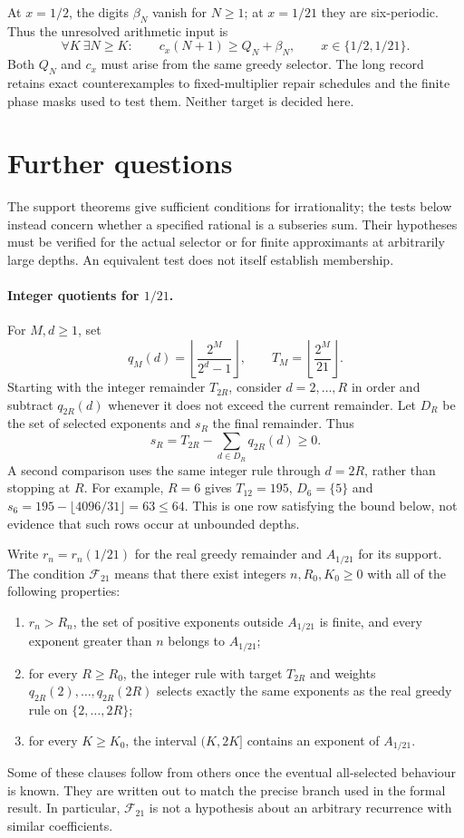 \documentclass[11pt]{article}
\begin{document}
At $x=1/2$, the digits $\beta_N$ vanish for $N\ge1$; at $x=1/21$ they
are six-periodic.  Thus the unresolved arithmetic input is
\begin{equation}
 \boxed{\quad
 \forall K\ \exists N\ge K:\qquad
 c_x(N+1)\ge Q_N+\beta_N,
 \qquad x\in\{1/2,1/21\}.
 \quad}\label{eq:actual-selector-obligation}
\end{equation}
Both $Q_N$ and $c_x$ must arise from the same greedy selector.
The long record retains exact counterexamples to fixed-multiplier repair
schedules and the finite phase masks used to test them.
Neither target is decided here.

\section{Further questions}\label{sec:open}
The support theorems give sufficient conditions for irrationality;
the tests below instead concern whether a specified rational is a
subseries sum.  Their hypotheses must be verified for the actual
selector or for finite approximants at arbitrarily large depths.
An equivalent test does not itself establish membership.

\paragraph{Integer quotients for $1/21$.}
For $M,d\ge1$, set
\[
 q_M(d)=\left\lfloor\frac{2^M}{2^d-1}\right\rfloor,
 \qquad T_M=\left\lfloor\frac{2^M}{21}\right\rfloor.
\]
Starting with the integer remainder $T_{2R}$, consider $d=2,\ldots,R$
in order and subtract $q_{2R}(d)$ whenever it does not exceed the current
remainder.  Let $D_R$ be the set of selected exponents and $s_R$ the final
remainder.  Thus
\[
 s_R=T_{2R}-\sum_{d\in D_R}q_{2R}(d)\ge0.
\]
A second comparison uses the same integer rule through $d=2R$, rather
than stopping at $R$.
For example, $R=6$ gives $T_{12}=195$, $D_6=\{5\}$ and
$s_6=195-\lfloor4096/31\rfloor=63\le64$.  This is one row satisfying
the bound below, not evidence that such rows occur at unbounded depths.


Write $r_n=r_n(1/21)$ for the real greedy remainder and $A_{1/21}$ for its
support.  The condition $\mathcal F_{21}$ means that there exist integers
$n,R_0,K_0\ge0$ with all of the following properties:
\begin{enumerate}
\item $r_n>R_n$, the set of positive exponents outside $A_{1/21}$ is
finite, and every exponent greater than $n$ belongs to $A_{1/21}$;
\item for every $R\ge R_0$, the integer rule with target $T_{2R}$ and
weights $q_{2R}(2),\ldots,q_{2R}(2R)$ selects exactly the same exponents
as the real greedy rule on $\{2,\ldots,2R\}$;
\item for every $K\ge K_0$, the interval $(K,2K]$ contains an exponent
of $A_{1/21}$.
\end{enumerate}
Some of these clauses follow from others once the eventual all-selected
behaviour is known.  They are written out to match the precise branch
used in the formal result.  In particular, $\mathcal F_{21}$ is not a
hypothesis about an arbitrary recurrence with similar coefficients.
\end{document}
